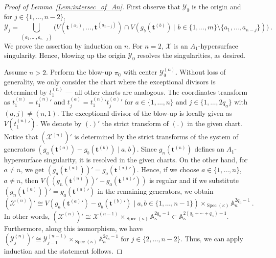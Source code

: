 \documentclass[letter,11pt]{amsart}
\renewcommand{\AA}{\ensuremath{\mathbb{A}}}
\DeclareMathOperator{\Spec}{Spec}
\renewcommand{\t}{\boldsymbol{t}}
\theoremstyle{theorem}
\theoremstyle{definition}
\numberwithin{equation}{section}
\begin{document}
\begin{proof}[Proof of Lemma~\ref{Lem:intersec_of_An}]
	First observe that $ \mathcal{Y}_0 $ is the origin
	and for $ j \in \{ 1, \ldots, n-2 \} $,
	\[  
		\mathcal{Y}_j 
		= 
		\bigcup_{(a_1, \ldots, a_{n-j})}
		\Big( 
		V(\t^{(a_1)}, \ldots, \t^{(a_{n-j})}) \cap V(g_b(\t^{(b)}) \mid b \in \{1,\ldots, m \} \setminus \{a_1, \ldots, a_{n-j}\})
		\Big)  
		\ .
	\]  
	We prove the assertion by induction on $ n $.
	For $ n = 2 $, $ \mathcal{X} $ is an $ A_1 $-hypersurface singularity. 
	Hence, blowing up the origin $ \mathcal{Y}_0 $ resolves the singularities, as desired. 
	
	Assume $ n > 2 $.
	Perform the blow-up $ \pi_0 $ with center $ \mathcal{Y}_0^{(n)} $.
	Without loss of generality, we only consider the chart where the exceptional divisors is determined by $ t_1^{(n)} $ --- all other charts are analogous. 
	The coordinates transform as 
	$ t_1^{(n)} = {t_1^{(n)}}' $ and 
	$ t^{(a)}_j = {t_1^{(n)}}' {t^{(a)}_j}' $ for $ a \in \{ 1, \ldots, n \} $ and $ j \in \{ 1, \ldots, 2q_a \} $ with $ (a,j) \neq (n,1) $.   
	The exceptional divisor of the blow-up is locally given as $ V ({t_1^{(n)}}') $.
	We denote by $ (.)' $ the strict transform of $ (.) $ in the given chart.  
	Notice that $ (\mathcal{X}^{(n)})' $ is determined by the 
	strict transforms of the system of generators $ ( g_a (\t^{(a)}) - g_b (\t^{(b)}) \mid a, b ) $.
	Since $ g_n (\t^{(n)}) $ defines an $ A_1 $-hypersurface singularity, 
	it is resolved in the given charts. 
	On the other hand, for $ a \neq n $, we get
	$ (g_a (\t^{(a)}))'= g_a ({\t^{(a)}}')$. 
	Hence, if we choose $ a \in \{ 1, \ldots, n \} $, $ a \neq n $, then $ V( (g_n (\t^{(n)}))' - g_a ({\t^{(a)}}')) $ is regular
	and if we substitute  $ (g_n (\t^{(n)}))' = g_a ({\t^{(a)}}') $ in the remaining generators, 
	we obtain
	\[ 
		(\mathcal{X}^{(n)})' \cong V ( g_a ({\t^{(a)}}') - g_b ({\t^{(b)}}') \mid a, b \in \{ 1, \ldots, n-1\} ) \times_{\Spec(\kappa) } \AA_\kappa^{2q_n-1}
		\ . 
	\]
	In other words, 
	$ (\mathcal{X}^{(n)})' \cong \mathcal{X}^{(n-1)} \times_{\Spec(\kappa)} \AA_\kappa^{2q_n-1}  \subset \AA_\kappa^{2(q_1+ \cdots + q_n) - 1} $.
	Furthermore, along this isomorphism, we have 
	$ ( \mathcal{Y}_j^{(n)} )' \cong \mathcal{Y}_{j-1}^{(n-1)}\times_{\Spec(\kappa)} \AA_\kappa^{2q_n-1} $ for $ j \in \{ 2, \ldots, n -2 \} $. 
	Thus, we can apply induction and the statement follows. 
\end{proof}
\end{document}

